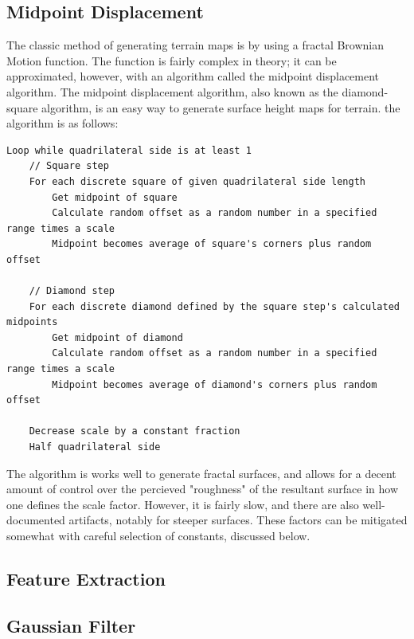 \documentclass{article}
\newcommand{\tab}{\hspace*{2em}}
\begin{document}
        \subsection{Midpoint Displacement}
    \tab The classic method of generating terrain maps is by using a fractal Brownian Motion
function\cite{mandelbrot68}. The function is fairly complex in theory; it can be approximated,
however, with an algorithm called the midpoint displacement algorithm. The midpoint displacement
algorithm, also known as the diamond-square algorithm, is an easy way to generate surface height
maps for terrain. the algorithm is as follows\cite{martz97}:
    \begin{verbatim}
Loop while quadrilateral side is at least 1
    // Square step
    For each discrete square of given quadrilateral side length
        Get midpoint of square
        Calculate random offset as a random number in a specified range times a scale
        Midpoint becomes average of square's corners plus random offset

    // Diamond step
    For each discrete diamond defined by the square step's calculated midpoints
        Get midpoint of diamond
        Calculate random offset as a random number in a specified range times a scale
        Midpoint becomes average of diamond's corners plus random offset

    Decrease scale by a constant fraction
    Half quadrilateral side

    \end{verbatim}


    \tab The algorithm is works well to generate fractal surfaces, and allows for a decent amount
of control over the percieved "roughness" of the resultant surface in how one defines the scale
factor. However, it is fairly slow, and there are also well-documented artifacts, notably for
steeper surfaces. These factors can be mitigated somewhat with careful selection of constants,
discussed below.

        \subsection{Feature Extraction}

        \subsection{Gaussian Filter}
\end{document}
